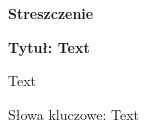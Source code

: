 \thispagestyle{empty}

\begin{po}
	\begin{center}
		\textbf{Streszczenie}
	\end{center}
	\textbf{Tytuł: Text}
	
	Text
	
	Słowa kluczowe: Text
\end{po}